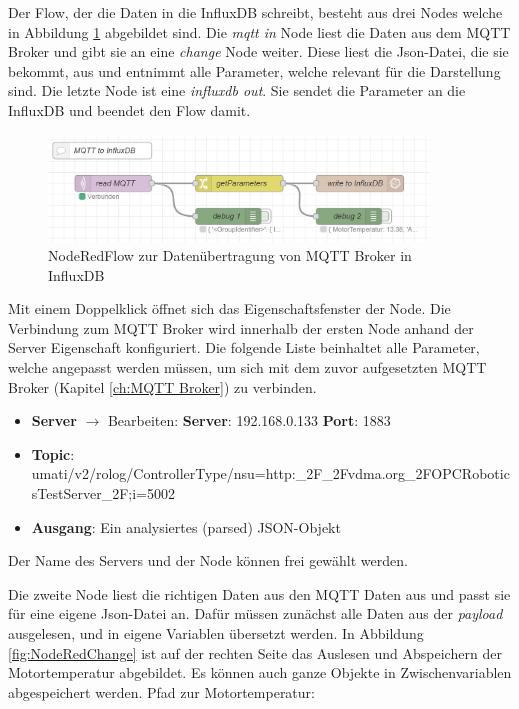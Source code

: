 \documentclass[a4paper, 12pt, oneside, toc=listofnumbered, bibliography=totoc]{scrbook}
\begin{document}
			Der Flow, der die Daten in die InfluxDB schreibt, besteht aus drei Nodes welche in Abbildung \ref{fig:flow} abgebildet sind. Die \textit{mqtt in} Node liest die Daten aus dem MQTT Broker und gibt sie an eine \textit{change} Node weiter. Diese liest die Json-Datei, die sie bekommt, aus und entnimmt alle Parameter, welche relevant für die Darstellung sind. Die letzte Node ist eine \textit{influxdb out}. Sie sendet die Parameter an die InfluxDB und beendet den Flow damit. 
			
			\begin{figure}[H]
				\centering
				\includegraphics[width=0.9\textwidth]{res/NodeRedFlow.png}
				\caption{NodeRedFlow zur Datenübertragung von MQTT Broker in InfluxDB}
				\label{fig:flow}
			\end{figure}
			
			Mit einem Doppelklick öffnet sich das Eigenschaftsfenster der Node. Die Verbindung zum MQTT Broker wird innerhalb der ersten Node anhand der Server Eigenschaft konfiguriert. Die folgende Liste beinhaltet alle Parameter, welche angepasst werden müssen, um sich mit dem zuvor aufgesetzten MQTT Broker (Kapitel \ref{ch:MQTT Broker}) zu verbinden.
			
			\begin{itemize}
				\item \textbf{Server} $\rightarrow$ Bearbeiten:
				\subitem \textbf{Server}: 192.168.0.133
				\subitem \textbf{Port}: 1883
				\item \textbf{Topic}: umati/v2/rolog/ControllerType/nsu=http:\_2F\_2Fvdma.org\_2FOPCRobotics\linebreak TestServer\_2F;i=5002
				\item \textbf{Ausgang}: Ein analysiertes (parsed) JSON-Objekt
			\end{itemize}
			Der Name des Servers und der Node können frei gewählt werden.
			
			Die zweite Node liest die richtigen Daten aus den MQTT Daten aus und passt sie für eine eigene Json-Datei an. Dafür müssen zunächst alle Daten aus der \textit{payload} ausgelesen, und in eigene Variablen übersetzt werden. In Abbildung \ref{fig:NodeRedChange} ist auf der rechten Seite das Auslesen und Abspeichern der Motortemperatur abgebildet. Es können auch ganze Objekte in Zwischenvariablen abgespeichert werden. Pfad zur Motortemperatur:
			
\end{document}

